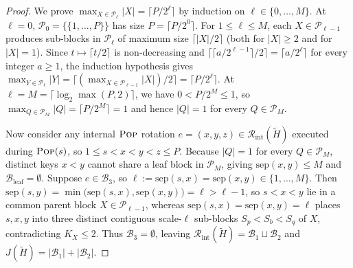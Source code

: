 \documentclass[11pt]{article}
\theoremstyle{definition}
\theoremstyle{remark}
\newcommand{\sep}{\mathrm{sep}}
\newcommand{\POP}{\textnormal{\scshape Pop}}
\begin{document}
\begin{proof}
We prove $\max_{X \in \mathcal{P}_\ell} |X| = \lceil P / 2^\ell \rceil$ by induction on $\ell \in \{0, \dots, M\}$. At $\ell = 0$, $\mathcal{P}_0 = \{\{1, \dots, P\}\}$ has size $P = \lceil P / 2^0 \rceil$. For $1 \le \ell \le M$, each $X \in \mathcal{P}_{\ell-1}$ produces sub-blocks in $\mathcal{P}_\ell$ of maximum size $\lceil |X| / 2 \rceil$ (both for $|X| \ge 2$ and for $|X| = 1$). Since $t \mapsto \lceil t / 2 \rceil$ is non-decreasing and $\big\lceil \lceil a / 2^{\ell-1} \rceil / 2 \big\rceil = \lceil a / 2^\ell \rceil$ for every integer $a \ge 1$, the induction hypothesis gives $\max_{Y \in \mathcal{P}_\ell} |Y| = \big\lceil (\max_{X \in \mathcal{P}_{\ell-1}} |X|) / 2 \big\rceil = \lceil P / 2^\ell \rceil$. At $\ell = M = \lceil \log_2 \max(P, 2) \rceil$, we have $0 < P / 2^M \le 1$, so $\max_{Q \in \mathcal{P}_M} |Q| = \lceil P / 2^M \rceil = 1$ and hence $|Q| = 1$ for every $Q \in \mathcal{P}_M$.

Now consider any internal $\POP$ rotation $e = (x, y, z) \in \mathcal{R}_{\mathrm{int}}(\widetilde{H})$ executed during $\POP(s)$, so $1 \le s < x < y < z \le P$. Because $|Q| = 1$ for every $Q \in \mathcal{P}_M$, distinct keys $x < y$ cannot share a leaf block in $\mathcal{P}_M$, giving $\sep(x, y) \le M$ and $\mathcal{B}_{\mathrm{leaf}} = \emptyset$. Suppose $e \in \mathcal{B}_3$, so $\ell := \sep(s, x) = \sep(x, y) \in \{1, \dots, M\}$. Then $\sep(s, y) = \min\big(\sep(s, x), \sep(x, y)\big) = \ell > \ell - 1$, so $s < x < y$ lie in a common parent block $X \in \mathcal{P}_{\ell-1}$, whereas $\sep(s, x) = \sep(x, y) = \ell$ places $s, x, y$ into three distinct contiguous scale-$\ell$ sub-blocks $S_p < S_b < S_q$ of $X$, contradicting $K_X \le 2$. Thus $\mathcal{B}_3 = \emptyset$, leaving $\mathcal{R}_{\mathrm{int}}(\widetilde{H}) = \mathcal{B}_1 \sqcup \mathcal{B}_2$ and $J(\widetilde{H}) = |\mathcal{B}_1| + |\mathcal{B}_2|$.
\end{proof}
\end{document}
